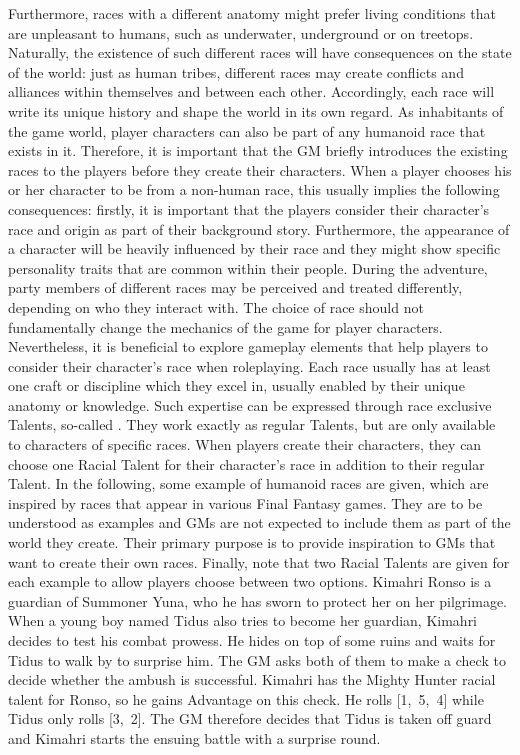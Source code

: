 Furthermore, races with a different anatomy might prefer living conditions that are unpleasant to humans, such as underwater, underground or on treetops.
Naturally, the existence of such different races will have consequences on the state of the world:
just as human tribes, different races may create conflicts and alliances within themselves and between each other.
Accordingly, each race will write its unique history and shape the world in its own regard.
%
\newpage
%
\ofpar
%
As inhabitants of the game world, player characters can also be part of any humanoid race that exists in it.
Therefore, it is important that the GM briefly introduces the existing races to the players before they create their characters.  
When a player chooses his or her character to be from a non-human race, this usually implies the following consequences:  
firstly, it is important that the players consider their character's race and origin as part of their background story.
Furthermore, the appearance of a character will be heavily influenced by their race and they might show specific personality traits that are common within their people. 
During the adventure, party members of different races may be perceived and treated differently, depending on who they interact with.
%
\vfill
%
The choice of race should not fundamentally change the mechanics of the game for player characters.
Nevertheless, it is beneficial to explore gameplay elements that help players to consider their character's race when roleplaying.
Each race usually has at least one craft or discipline which they excel in, usually enabled by their unique anatomy or knowledge.
Such expertise can be expressed through race exclusive Talents, so-called .
They work exactly as regular Talents, but are only available to characters of specific races.
When players create their characters, they can choose one Racial Talent for their character's race in addition to their regular Talent.
In the following, some example of humanoid races are given, which are inspired by races that appear in various Final Fantasy games.
They are to be understood as examples and GMs are not expected to include them as part of the world they create.
Their primary purpose is to provide inspiration to GMs that want to create their own races.
Finally, note that two Racial Talents are given for each example to allow players choose between two options.
%
\vfill
%
{
	Kimahri Ronso is a guardian of Summoner Yuna, who he has sworn to protect her on her pilgrimage. 
	When a young boy named Tidus also tries to become her guardian, Kimahri decides to test his combat prowess.
	He hides on top of some ruins and waits for Tidus to walk by to surprise him.
	The GM asks both of them to make a check to decide whether the ambush is successful.
 	Kimahri has the Mighty Hunter racial talent for Ronso, so he gains Advantage on this check.
	He rolls [1,~5,~4] while Tidus only rolls [3,~2].
	The GM therefore decides that Tidus is taken off guard and Kimahri starts the ensuing battle with a surprise round.
}
